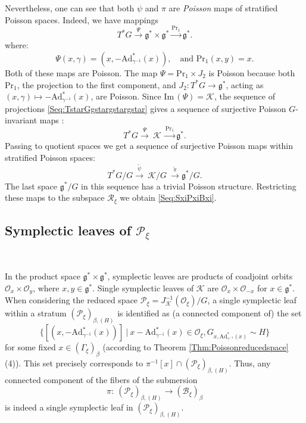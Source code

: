 \documentclass[12pt]{amsart}
\theoremstyle{definition}
\numberwithin{equation}{section}
\def\Im{\mathrm{Im}\,}
\newcommand{\gstar}{\mathfrak{g}^*}
\newcommand{\Oxi}{\mathcal{O}_{\xi}}
\newcommand{\Reducedxi}{\mathcal{R}_\xi}
\newcommand{\SET}[1]{\{#1\}}
\newcommand{\Pxi}{\mathcal{P}_{\xi}}
\newcommand{\Bxi}{\mathcal{B}_{\xi}}
\newcommand{\Adjointaction}{\mathrm{Ad}}
\newcommand{\middleK}{\mathcal{K}}
\newcommand{\Projection}{\mathrm{Pr}}
\begin{document}
Nevertheless, one can see that both $\psi$ and $\pi$ are \textit{Poisson} maps of stratified Poisson spaces.  Indeed, we have mappings
	\begin{equation}
		\label{Seq:TstarGgstargstargstar}
		T^*G\stackrel{\Psi}{\longrightarrow} \gstar\times \gstar \stackrel{\Projection_1}{\longrightarrow} \gstar.
	\end{equation}
	where: 
	\begin{equation*} 
		\Psi(x,\gamma) =  (x,-{\Adjointaction^*_{\gamma^{-1}}}(x)),\quad \mbox{and } \Projection_1(x,y)=  x .
	\end{equation*}
	Both of these maps are Poisson. The map  $\Psi=\Projection_1 \times J_2$ is Poisson because both $\Projection_1$,  the projection to the first component, and 
$J_2: T^*G \to \gstar$, acting as $(x,\gamma) \mapsto -{\Adjointaction^*_{\gamma^{-1}}}(x)$,
	are Poisson.  Since $\Im(\Psi)=\middleK$, the sequence of projections \eqref{Seq:TstarGgstargstargstar} gives a sequence of surjective Poisson $G$-invariant maps :
	\begin{equation}\label{Seq:TstarGgstargstargstar2}
		T^*G\stackrel{\Psi}{\longrightarrow}~\middleK  ~ \stackrel{\Projection_1}{\longrightarrow} \gstar.
	\end{equation}
	Passing to quotient spaces we get a sequence of surjective Poisson maps within stratified Poisson spaces:
	\begin{equation}\label{Seq:TstarGgstargstargstaroverG}
		T^*G/G\stackrel{\tilde{\psi}}{\longrightarrow}~ \middleK/G~ \stackrel{\tilde{\pi}}{\longrightarrow} \gstar/G.
	\end{equation}
	The last space $\gstar/G$ in this sequence has a trivial Poisson structure.
	Restricting these maps to the subspace $\Reducedxi$ we obtain \eqref{Seq:SxiPxiBxi}.

	\subsection{Symplectic leaves of $\Pxi$}\label{Sec:symplecticleavesinPxi}~
	
	In the product space $\gstar \times \gstar$, symplectic leaves are products of coadjoint orbits $\mathcal{O}_{x} \times \mathcal{O}_{y}$, where $x, y \in \gstar$. Single symplectic leaves of $\middleK$ are $\mathcal{O}_{x} \times \mathcal{O}_{-x}$ for $x \in \gstar$. When considering the reduced space $\Pxi= J_\middleK^{-1}(\Oxi )/G$, a single symplectic leaf within a stratum 
	$(\Pxi)_{\beta,(H)}$ 
	is identified as (a connected component of) the set     
	$$\SET{[(x,-\Adjointaction^*_{\gamma^{-1}}(x))] ~|~ x - \Adjointaction^*_{\gamma^{-1}}(x) \in \Oxi, G_{x,\Adjointaction^*_{\gamma^{-1}}(x)} \sim H}$$ 
	for some fixed $x \in (\Gamma_{\xi})_{\beta}$  (according to Theorem \ref{Thm:Poissonreducedspace} (4)). 
This set precisely corresponds to $\pi^{-1}[x] \cap (\Pxi)_{\beta, (H)}$. Thus, any connected component of the fibers of the submersion 
	$$\pi:~(\Pxi)_{\beta,(H)} \to (\Bxi)_{\beta}$$ 
	is indeed a single symplectic leaf in $(\Pxi)_{\beta,(H)}$.
	
\end{document}
